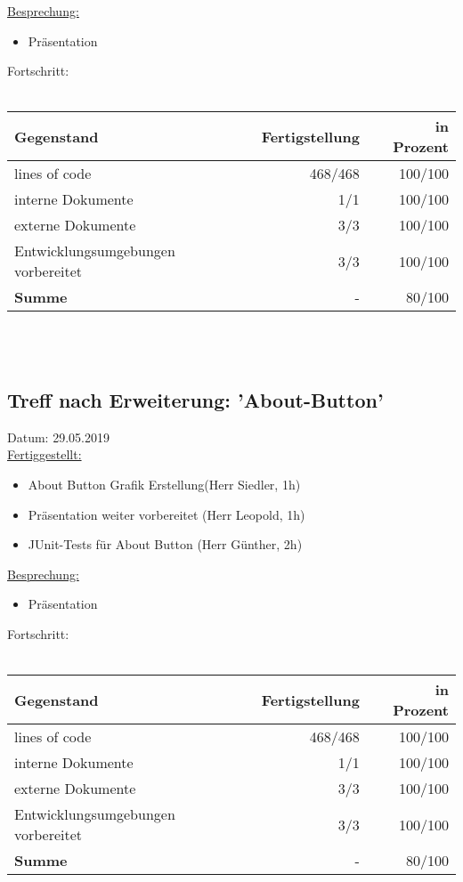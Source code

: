 \documentclass[12pt]{article}
\begin{document}
\uline{Besprechung:}
\begin{itemize}\itemsep0em
\item Präsentation
\end{itemize}

Fortschritt:\\\\
\begin{tabularx}{\textwidth}{|X|r|r|} \hline
\textbf{Gegenstand}&\textbf{Fertigstellung} & \textbf{in Prozent}\\ \hline
lines of code & 468/468  & 100/100\\ \hline
interne Dokumente & 1/1 & 100/100  \\ \hline
externe Dokumente & 3/3 & 100/100 \\ \hline
Entwicklungsumgebungen vorbereitet & 3/3 & 100/100 \\ \hline
\textbf{Summe} & - & 80/100  \\ \hline
\end{tabularx}\\\\

\newpage
\subsection{Treff nach Erweiterung: 'About-Button'}
Datum: 29.05.2019 \\

\uline{Fertiggestellt:}
\begin{itemize}\itemsep0em
\item About Button Grafik Erstellung(Herr Siedler, 1h)
\item Präsentation weiter vorbereitet (Herr Leopold, 1h)
\item JUnit-Tests für About Button (Herr Günther, 2h)
\end{itemize}

\uline{Besprechung:}
\begin{itemize}\itemsep0em
\item Präsentation
\end{itemize}

Fortschritt:\\\\
\begin{tabularx}{\textwidth}{|X|r|r|} \hline
\textbf{Gegenstand}&\textbf{Fertigstellung} & \textbf{in Prozent}\\ \hline
lines of code & 468/468  & 100/100\\ \hline
interne Dokumente & 1/1 & 100/100  \\ \hline
externe Dokumente & 3/3 & 100/100 \\ \hline
Entwicklungsumgebungen vorbereitet & 3/3 & 100/100 \\ \hline
\textbf{Summe} & - & 80/100  \\ \hline
\end{tabularx}\\\\
\end{document}

